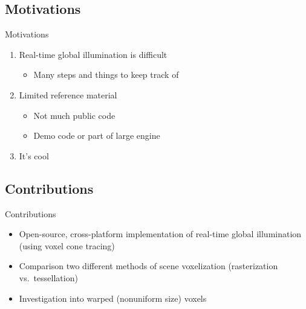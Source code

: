 \documentclass[10pt]{beamer}
\begin{document}
\subsection{Motivations}
\begin{frame}{Motivations}
  \begin{enumerate}
    \item Real-time global illumination is difficult %
      \begin{itemize}
        \item Many steps and things to keep track of
      \end{itemize}
    \item Limited reference material
        \begin{itemize}
          \item Not much public code  %
          \item Demo code or part of large engine %
        \end{itemize}
    \pause
    \item It's cool %
  \end{enumerate}
\end{frame}

\subsection{Contributions}
\begin{frame}{Contributions}
  \begin{itemize}
    \item Open-source, cross-platform implementation of real-time global illumination (using voxel cone tracing) %
    \item Comparison two different methods of scene voxelization (rasterization vs.\ tessellation)%
    \item Investigation into warped (nonuniform size) voxels %
  \end{itemize}
\end{frame}
\end{document}
